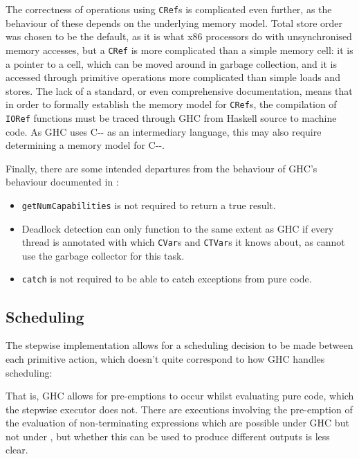 The correctness of operations using \verb|CRef|s is complicated even
further, as the behaviour of these depends on the underlying memory
model. Total store order was chosen to be the default, as it is what
x86 processors do with unsynchronised memory accesses, but a
\verb|CRef| is more complicated than a simple memory cell: it is a
pointer to a cell, which can be moved around in garbage collection,
and it is accessed through primitive operations more complicated than
simple loads and stores. The lack of a standard, or even comprehensive
documentation, means that in order to formally establish the memory
model for \verb|CRef|s, the compilation of \verb|IORef| functions must
be traced through GHC from Haskell source to machine code. As GHC uses
C{-}{-} as an intermediary language, this may also require determining
a memory model for C{-}{-}.

Finally, there are some intended departures from the behaviour of
GHC's behaviour documented in :

\begin{itemize}
\item \verb|getNumCapabilities| is not required to return a true
  result.

\item Deadlock detection can only function to the same extent as GHC
  if every thread is annotated with which \verb|CVar|s and
  \verb|CTVar|s it knows about, as \dejafu{} cannot use the garbage
  collector for this task.

\item \verb|catch| is not required to be able to catch exceptions from
  pure code.
\end{itemize}

\subsection{Scheduling}
\label{sec:correctness-execution-scheduling}

The stepwise implementation allows for a scheduling decision to be
made between each primitive action, which doesn't quite correspond to
how GHC handles scheduling:


That is, GHC allows for pre-emptions to occur whilst evaluating pure
code, which the stepwise executor does not. There are executions
involving the pre-emption of the evaluation of non-terminating
expressions which are possible under GHC but not under \dejafu{}, but
whether this can be used to produce different outputs is less clear.
